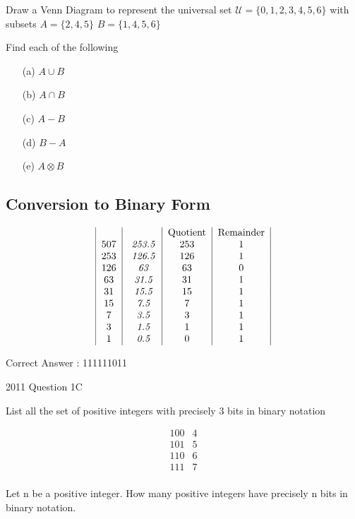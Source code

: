 \documentclass[a4paper,12pt]{article}
\begin{document}
Draw a Venn Diagram to represent the universal set
$\mathcal{U} = \{0,1,2,3,4,5,6\}$ with subsets
$A = \{2,4,5\}$
$B = \{1,4,5,6\}$

Find each of the following
\begin{itemize}
\item[(a)] $A \cup B $
\item[(b)] $A \cap B $
\item[(c)] $A-B$
\item[(d)] $B-A$
\item[(e)] $A \otimes B$
\end{itemize}

\newpage
\subsection*{Conversion to Binary Form}
\[
\begin{tabular}{|c|c|c|c|}
	&		&	Quotient	&	Remainder	\\
507	&\emph{	253.5	}&	253	&	1	\\
253	&\emph{	126.5	}&	126	&	1	\\
126	&\emph{	63	}&	63	&	0	\\
63	&\emph{	31.5	}&	31	&	1	\\
31	&\emph{	15.5	}&	15	&	1	\\
15	&\emph{	7.5	}&	7	&	1	\\
7	&\emph{	3.5	}&	3	&	1	\\
3	&\emph{	1.5	}&	1	&	1	\\
1	&\emph{	0.5	}&	0	&	1	\\
\end{tabular} \]

Correct Answer : 111111011


2011 Question 1C

List all the set of positive integers with precisely 3 bits in binary notation

\[\begin{array}{|c|c|}
100 & 4 \\
101 & 5 \\
110 & 6 \\
111 & 7 \\
\end{array}\]

Let n be a positive integer. How many positive integers have precisely n bits in binary notation. 
\end{document}
